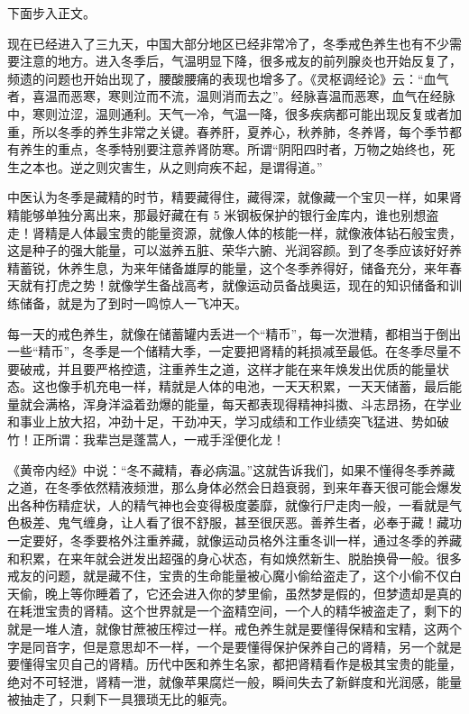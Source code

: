 下面步入正文。

现在已经进入了三九天，中国大部分地区已经非常冷了，冬季戒色养生也有不少需要注意的地方。进入冬季后，气温明显下降，很多戒友的前列腺炎也开始反复了，频遗的问题也开始出现了，腰酸腰痛的表现也增多了。《灵枢调经论》云：“血气者，喜温而恶寒，寒则泣而不流，温则消而去之”。经脉喜温而恶寒，血气在经脉中，寒则泣涩，温则通利。天气一冷，气温一降，很多疾病都可能出现反复或者加重，所以冬季的养生非常之关键。春养肝，夏养心，秋养肺，冬养肾，每个季节都有养生的重点，冬季特别要注意养肾防寒。所谓“阴阳四时者，万物之始终也，死生之本也。逆之则灾害生，从之则疴疾不起，是谓得道。”

中医认为冬季是藏精的时节，精要藏得住，藏得深，就像藏一个宝贝一样，如果肾精能够单独分离出来，那最好藏在有 5 米钢板保护的银行金库内，谁也别想盗走！肾精是人体最宝贵的能量资源，就像人体的核能一样，就像液体钻石般宝贵，这是种子的强大能量，可以滋养五脏、荣华六腑、光润容颜。到了冬季应该好好养精蓄锐，休养生息，为来年储备雄厚的能量，这个冬季养得好，储备充分，来年春天就有打虎之势！就像学生备战高考，就像运动员备战奥运，现在的知识储备和训练储备，就是为了到时一鸣惊人一飞冲天。

每一天的戒色养生，就像在储蓄罐内丢进一个“精币”，每一次泄精，都相当于倒出一些“精币”，冬季是一个储精大季，一定要把肾精的耗损减至最低。在冬季尽量不要破戒，并且要严格控遗，注重养生之道，这样才能在来年焕发出优质的能量状态。这也像手机充电一样，精就是人体的电池，一天天积累，一天天储蓄，最后能量就会满格，浑身洋溢着劲爆的能量，每天都表现得精神抖擞、斗志昂扬，在学业和事业上放大招，冲劲十足，干劲冲天，学习成绩和工作业绩突飞猛进、势如破竹！正所谓：我辈岂是蓬蒿人，一戒手淫便化龙！

《黄帝内经》中说：“冬不藏精，春必病温。”这就告诉我们，如果不懂得冬季养藏之道，在冬季依然精液频泄，那么身体必然会日趋衰弱，到来年春天很可能会爆发出各种伤精症状，人的精气神也会变得极度萎靡，就像行尸走肉一般，一看就是气色极差、鬼气缠身，让人看了很不舒服，甚至很厌恶。善养生者，必奉于藏！藏功一定要好，冬季要格外注重养藏，就像运动员格外注重冬训一样，通过冬季的养藏和积累，在来年就会迸发出超强的身心状态，有如焕然新生、脱胎换骨一般。很多戒友的问题，就是藏不住，宝贵的生命能量被心魔小偷给盗走了，这个小偷不仅白天偷，晚上等你睡着了，它还会进入你的梦里偷，虽然梦是假的，但梦遗却是真的在耗泄宝贵的肾精。这个世界就是一个盗精空间，一个人的精华被盗走了，剩下的就是一堆人渣，就像甘蔗被压榨过一样。戒色养生就是要懂得保精和宝精，这两个字是同音字，但是意思却不一样，一个是要懂得保护保养自己的肾精，另一个就是要懂得宝贝自己的肾精。历代中医和养生名家，都把肾精看作是极其宝贵的能量，绝对不可轻泄，肾精一泄，就像苹果腐烂一般，瞬间失去了新鲜度和光润感，能量被抽走了，只剩下一具猥琐无比的躯壳。

